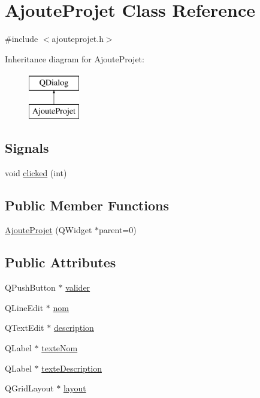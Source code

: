\hypertarget{class_ajoute_projet}{}\section{Ajoute\+Projet Class Reference}
\label{class_ajoute_projet}


{\ttfamily \#include $<$ajouteprojet.\+h$>$}

Inheritance diagram for Ajoute\+Projet\+:\begin{figure}[H]
\begin{center}
\leavevmode
\includegraphics[height=2.000000cm]{class_ajoute_projet}
\end{center}
\end{figure}
\subsection*{Signals}
\begin{DoxyCompactItemize}
\item 
void \hyperlink{class_ajoute_projet_a6bae9d51f4bdaf2536eb99b3fc034a5c}{clicked} (int)
\end{DoxyCompactItemize}
\subsection*{Public Member Functions}
\begin{DoxyCompactItemize}
\item 
\hyperlink{class_ajoute_projet_a402ff08840f6273028c7505dac5c1a19}{Ajoute\+Projet} (Q\+Widget $\ast$parent=0)
\end{DoxyCompactItemize}
\subsection*{Public Attributes}
\begin{DoxyCompactItemize}
\item 
Q\+Push\+Button $\ast$ \hyperlink{class_ajoute_projet_ab285625086a180004e0015c465b9a61a}{valider}
\item 
Q\+Line\+Edit $\ast$ \hyperlink{class_ajoute_projet_a40704febac7e1dcdb7ee28cf8dee2788}{nom}
\item 
Q\+Text\+Edit $\ast$ \hyperlink{class_ajoute_projet_a16f62d8dc09c4940f8ecdc1dbfbd394c}{description}
\item 
Q\+Label $\ast$ \hyperlink{class_ajoute_projet_a39443276944c00ca6c510c3c0da60c5d}{texte\+Nom}
\item 
Q\+Label $\ast$ \hyperlink{class_ajoute_projet_a6c278394b5c4a61324326a32e468976a}{texte\+Description}
\item 
Q\+Grid\+Layout $\ast$ \hyperlink{class_ajoute_projet_ac3d17ec156098dca6471980410263da6}{layout}
\end{DoxyCompactItemize}
